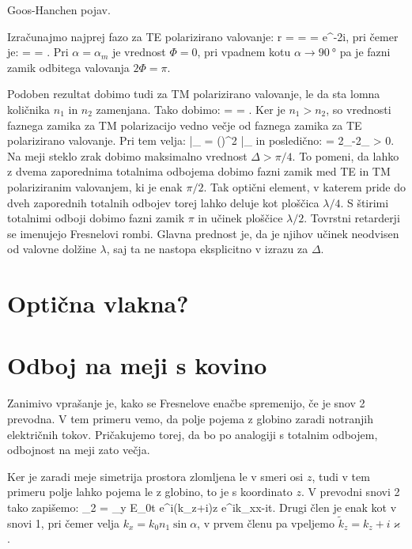 Goos-Hanchen pojav. 

Izračunajmo najprej fazo za TE polarizirano valovanje: 
\beq
r =  = 
= e^{-2i\Phi},
\eeq
pri čemer je:
\beq
\Phi = \arctan{} = \arctan{}.
\eeq
Pri $\alpha = \alpha_m$ je vrednost $\Phi=0$, pri vpadnem kotu $\alpha \to 90~\si{\degree}$ pa je
fazni zamik odbitega valovanja $2\Phi = \pi$. 

Podoben rezultat dobimo tudi za TM polarizirano valovanje, le da sta lomna količnika $n_1$ in $n_2$
zamenjana. Tako dobimo:
\beq
\Phi = \arctan{} = \arctan{}.
\eeq
Ker je $n_1 > n_2$, so vrednosti faznega zamika za TM polarizacijo vedno večje od faznega zamika za TE polarizirano
valovanje. Pri tem velja:
\beq
\tan \Phi |_ = \left(\right)^2 \tan \Phi |_
\eeq
in posledično:
\beq
\Delta = 2\Phi_-2\Phi_ > 0.
\eeq
Na meji steklo zrak dobimo maksimalno vrednost $\Delta > \pi/4$. To pomeni, da lahko z dvema zaporednima
totalnima odbojema dobimo fazni zamik med TE in TM polariziranim valovanjem, ki je enak $\pi/2$. Tak 
optični element, v katerem pride do dveh zaporednih totalnih odbojev torej lahko deluje kot ploščica
$\lambda/4$. S štirimi totalnimi odboji dobimo fazni zamik $\pi$ in učinek ploščice $\lambda/2$. Tovrstni
retarderji se imenujejo Fresnelovi rombi. Glavna prednost je, da je njihov učinek neodvisen od 
valovne dolžine $\lambda$, saj ta ne nastopa eksplicitno v izrazu za $\Delta$. 

\section{Optična vlakna?}
\section{Odboj na meji s kovino}
Zanimivo vprašanje je, kako se Fresnelove enačbe spremenijo, če je snov 2 prevodna. V tem primeru
vemo, da polje pojema z globino zaradi notranjih električnih tokov. Pričakujemo torej, da bo po analogiji
s totalnim odbojem, odbojnost na meji zato večja. 

Ker je zaradi meje simetrija prostora zlomljena le v smeri osi $z$, tudi v tem primeru polje
lahko pojema le z globino, to je s koordinato $z$. V prevodni snovi 2 tako zapišemo:
\beq
{}_2 = _y E_{0t} e^{i(k_z+i\varkappa)z} e^{ik_xx-i\omega t}.
\eeq
Drugi člen je enak kot v snovi 1, pri čemer velja $k_x = k_0 n_1 \sin \alpha$,
v prvem členu pa vpeljemo $\tilde{k}_z = k_z + i \varkappa$.

